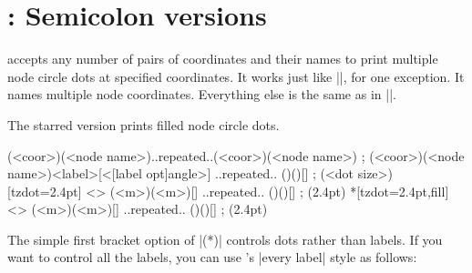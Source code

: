 \section{\protect\cmd{\tznodedots(*)}: Semicolon versions}
\label{s:tznodedots}

\icmd{\tznodedots} accepts any number of  pairs of coordinates and their names to print multiple node circle dots at specified coordinates.
It works just like |\tzdots|, for one exception. It names multiple node coordinates.
Everything else is the same as in |\tzdots|.

The starred version \icmd{\tznodedots*} prints filled node circle dots.

\begin{tzdef}
\tznodedots(<coor>)(<node name>)..repeated..(<coor>)(<node name>) ;
           (<coor>)(<node name>){<label>}[<[label opt]angle>]
                                        ..repeated.. ()(){}[] ; (<dot size>)
  [tzdot=2.4pt]     <> (<m>)(<m>){}[] ..repeated.. ()(){}[] ; (2.4pt)
 *[tzdot=2.4pt,fill]<> (<m>)(<m>){}[] ..repeated.. ()(){}[] ; (2.4pt)
\end{tzdef}



\begin{tzcode}{.3}
\end{tzcode}



The simple first bracket option of |\tznodedots(*)| controls dots rather than labels.
If you want to control all the labels, you can use \Tikz's |every label| style as follows:

\begin{tzcode}{.3}
\end{tzcode}



